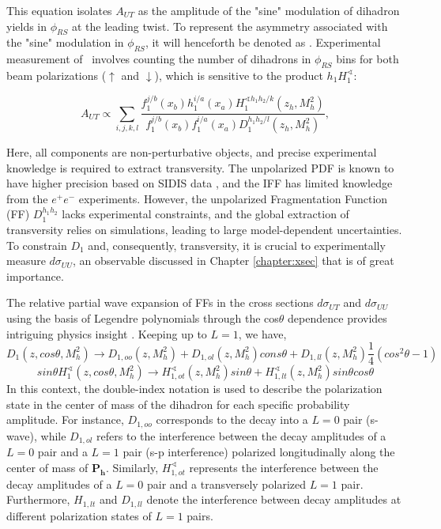 This equation isolates $A_{UT}$ as the amplitude of the "sine" modulation of dihadron yields in $\phi_{RS}$ at the leading twist. To represent the asymmetry associated with the "sine" modulation in $\phi_{RS}$, it will henceforth be denoted as \aut. Experimental measurement of \aut\ involves counting the number of dihadrons in $\phi_{RS}$ bins for both beam polarizations ($\uparrow$ and $\downarrow$), which is sensitive to the product $h_1 H^\sphericalangle_1$:

\begin{equation}
A_{UT} \propto \sum_{i,j,k,l} \frac{f_1^{j/b}(x_b) h_1^{i/a}(x_a) H_1^{\sphericalangle h_1h_2/k}(z_h,M^2_h) }{f_1^{j/b}(x_b) f_1^{i/a}(x_a) D_1^{h_1h_2/l}(z_h, M^2_h)},
\end{equation}

Here, all components are non-perturbative objects, and precise experimental knowledge is required to extract transversity. The unpolarized PDF is known to have higher precision based on SIDIS data \cite{H1:2015ubc}, and the IFF has limited knowledge from the $e^+e^-$ experiments. However, the unpolarized Fragmentation Function (FF) $D_1^{h_1h_2}$ lacks experimental constraints, and the global extraction of transversity relies on simulations, leading to large model-dependent uncertainties. To constrain $D_1$ and, consequently, transversity, it is crucial to experimentally measure $d\sigma_{UU}$, an observable discussed in Chapter \ref{chapter:xsec} that is of great importance.


The relative partial wave expansion of FFs in the  cross sections $d\sigma _{UT}$ and $d\sigma_{UU}$ using the basis of Legendre polynomials through the cos$\theta$ dependence provides intriguing physics insight \cite{Bacchetta:2002ux}. Keeping up to $L=1$, we have,
\begin{equation}
D_1(z, cos\theta, M^2_h)\rightarrow D_{1,oo}(z,M_h^2)+ D_{1,ol}(z,M_h^2) cons\theta + D_{1,ll}(z,M_h^2)\frac{1}{4}(cos^2\theta -1)
\end{equation}
\begin{equation}
sin\theta H_1^\sphericalangle(z, cos\theta, M^2_h)\rightarrow H_{1,ot}^\sphericalangle(z, M^2_h)sin\theta+ H_{1,lt}^\sphericalangle(z, M^2_h)sin\theta cos\theta
\end{equation}
In this context, the double-index notation is used to describe the polarization state in the center of mass of the dihadron for each specific probability amplitude. For instance, $D_{1, oo}$ corresponds to the decay into a $L=0$ pair (s-wave), while $D_{1,ol}$ refers to the interference between the decay amplitudes of a $L=0$ pair and a $L=1$ pair (s-p interference) polarized longitudinally along the center of mass of $\mathbf{P_h}$. Similarly, $H_{1,ot}^\sphericalangle$ represents the interference between the decay amplitudes of a $L=0$ pair and a transversely polarized $L=1$ pair. Furthermore, $H_{1, lt}$ and $D_{1, ll}$ denote the interference between decay amplitudes at different polarization states of $L=1$ pairs.


